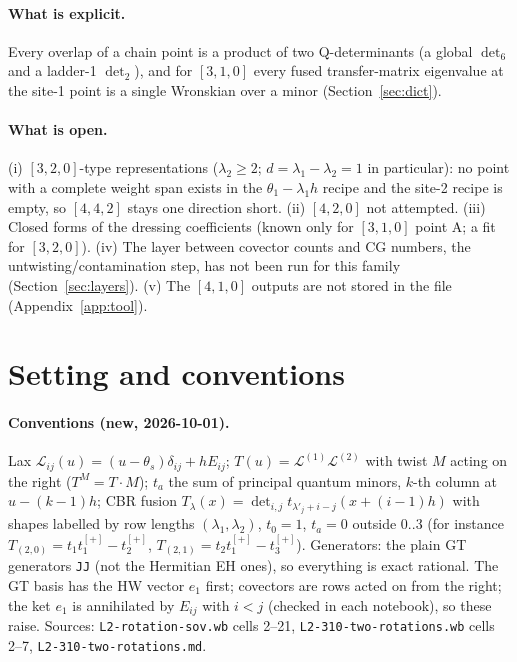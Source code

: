 \documentclass[11pt]{article}
\newcommand{\nb}[1]{\texttt{#1}}
\begin{document}
\paragraph{What is explicit.} Every overlap of a chain point is a product of two Q-determinants (a global $\det_6$ and a ladder-1 $\det_2$), and for $[3,1,0]$ every fused transfer-matrix eigenvalue at the site-1 point is a single Wronskian over a minor (Section~\ref{sec:dict}).

\paragraph{What is open.} (i) $[3,2,0]$-type representations ($\lambda_2\ge2$; $d=\lambda_1-\lambda_2=1$ in particular): no point with a complete weight span exists in the $\theta_1-\lambda_1h$ recipe and the site-2 recipe is empty, so $[4,4,2]$ stays one direction short. (ii) $[4,2,0]$ not attempted. (iii) Closed forms of the dressing coefficients (known only for $[3,1,0]$ point A; a fit for $[3,2,0]$). (iv) The layer between covector counts and CG numbers, the untwisting/contamination step, has not been run for this family (Section~\ref{sec:layers}). (v) The $[4,1,0]$ outputs are not stored in the file (Appendix~\ref{app:tool}).

\section{Setting and conventions}\label{sec:setting}

\paragraph{Conventions (new, 2026-10-01).} Lax $\mathcal L_{ij}(u)=(u-\theta_s)\delta_{ij}+hE_{ij}$; $T(u)=\mathcal L^{(1)}\mathcal L^{(2)}$ with twist $M$ acting on the right ($T^M=T\cdot M$); $t_a$ the sum of principal quantum minors, $k$-th column at $u-(k-1)h$; CBR fusion $T_\lambda(x)=\det_{i,j}t_{\lambda'_j+i-j}(x+(i-1)h)$ with shapes labelled by row lengths $(\lambda_1,\lambda_2)$, $t_0=1$, $t_a=0$ outside $0..3$ (for instance $T_{(2,0)}=t_1t_1^{[+]}-t_2^{[+]}$, $T_{(2,1)}=t_2t_1^{[+]}-t_3^{[+]}$). Generators: the plain GT generators \nb{JJ} (not the Hermitian EH ones), so everything is exact rational. The GT basis has the HW vector $e_1$ first; covectors are rows acted on from the right; the ket $e_1$ is annihilated by $E_{ij}$ with $i<j$ (checked in each notebook), so these raise. Sources: \nb{L2-rotation-sov.wb} cells 2--21, \nb{L2-310-two-rotations.wb} cells 2--7, \nb{L2-310-two-rotations.md}.
\end{document}
